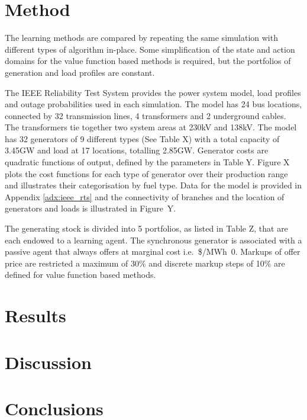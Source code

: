 \section{Method}
The learning methods are compared by repeating the same simulation with
different types of algorithm in-place.  Some simplification of the state
and action domains for the value function based methods is required, but the
portfolios of generation and load profiles are constant.

The IEEE Reliability Test System \cite{ieee79rts} provides the power system
model, load profiles and outage probabilities used in each simulation.  The
model has 24 bus locations, connected by 32 transmission lines, 4 transformers
and 2 underground cables.  The transformers tie together two system areas at
230kV and 138kV.  The model has 32 generators of 9 different types (See Table
X) with a total capacity of 3.45GW and load at 17 locations, totalling 2.85GW.
Generator costs are quadratic functions of output, defined by the parameters in
Table Y.  Figure X plots the cost functions for each type of generator over
their production range and illustrates their categorisation by fuel type.  Data
for the model is provided in Appendix \ref{adx:ieee_rts} and the connectivity
of branches and the location of generators and loads is illustrated in
Figure~Y.

The generating stock is divided into 5 portfolios, as listed in Table Z, that
are each endowed to a learning agent.  The synchronous generator is associated
with a passive agent that always offers at marginal cost i.e.~\$/MWh~0.
Markups of offer price are restricted a maximum of 30\% and discrete markup
steps of 10\% are defined for value function based methods.

%


\section{Results}
\section{Discussion}
\label{sec:discuss}
\section{Conclusions}
